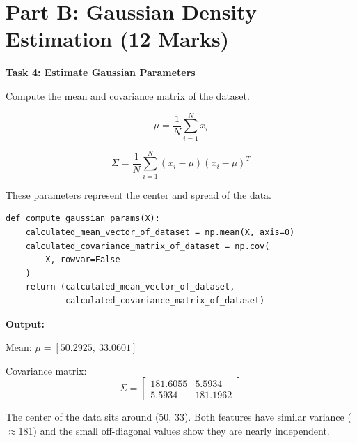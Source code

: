 \documentclass[12pt,a4paper]{article}
\begin{document}

\section*{Part B: Gaussian Density Estimation (12 Marks)}

\begin{tcolorbox}
\textbf{Task 4: Estimate Gaussian Parameters}

Compute the mean and covariance matrix of the dataset.

\[
\mu = \frac{1}{N} \sum_{i=1}^{N} x_i
\]

\[
\Sigma = \frac{1}{N} \sum_{i=1}^{N} (x_i - \mu)(x_i - \mu)^T
\]

These parameters represent the center and spread of the data.

\begin{lstlisting}
def compute_gaussian_params(X):
    calculated_mean_vector_of_dataset = np.mean(X, axis=0)
    calculated_covariance_matrix_of_dataset = np.cov(
        X, rowvar=False
    )
    return (calculated_mean_vector_of_dataset,
            calculated_covariance_matrix_of_dataset)
\end{lstlisting}

\textbf{Output:}

\vspace{4pt}
Mean: $\mu = [50.2925,\ 33.0601]$

\vspace{4pt}
Covariance matrix:
\[
\Sigma = \begin{bmatrix} 181.6055 & 5.5934 \\ 5.5934 & 181.1962 \end{bmatrix}
\]

The center of the data sits around (50, 33). Both features have similar variance ($\approx$181) and the small off-diagonal values show they are nearly independent.

\end{tcolorbox}

\vspace{14pt}
\end{document}
